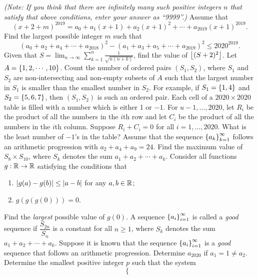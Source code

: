 \begin{enumerate}
    \textit{(Note: If you think that there are infinitely many such positive integers $n$ that satisfy that above conditions, enter your answer as ``9999''.)}
    \hyperrefitem[A::2020-O-1-9] Assume that \[(x+2+m)^{2019} = a_0 + a_1 (x+1) + a_2 (x+1)^2 + \cdots + a_{2019}(x+1)^{2019}.\] Find the largest possible integer $m$ such that \[(a_0 + a_2 + a_4 + \cdots + a_{2018})^2 - (a_1 + a_3 + a_5 + \cdots + a_{2019})^2 \leq 2020^{2019}.\]
    \hyperrefitem[A::2020-O-1-10] Given that $S = \displaystyle\lim_{n \to \infty} \sum_{k=1}^n \frac{1}{\sqrt{n(n+k)}}$, find the value of $\left\lfloor (S+2)^2 \right\rfloor$.
    \hyperrefitem[A::2020-O-1-11] Let $A = \left\lbrace 1, 2, \cdots, 10 \right\rbrace$. Count the number of ordered pairs $(S_1, S_2)$, where $S_1$ and $S_2$ are non-intersecting and non-empty subsets of $A$ such that the largest number in $S_1$ is smaller than the smallest number in $S_2$. For example, if $S_1 = \left\lbrace 1, 4 \right\rbrace$ and $S_2 = \left\lbrace 5, 6, 7 \right\rbrace$, then $(S_1, S_2)$ is such an ordered pair.
    \hyperrefitem[A::2020-O-1-12] Each cell of a $2020 \times 2020$ table is filled with a number which is either 1 or $-1$. For $u - 1, \ldots, 2020$, let $R_i$ be the product of all the numbers in the $i$th row and let $C_i$ be the product of all the numbers in the $i$th column. Suppose $R_i + C_i = 0$ for all $i = 1, \ldots, 2020$. What is the least number of $-1$'s in the table?
    \hyperrefitem[A::2020-O-1-13] Assume that the sequence $\left\lbrace a_k \right\rbrace_{k=1}^\infty$ follows an arithmetic progression with $a_2 + a_4 + a_9 = 24$. Find the maximum value of $S_8 \times S_{10}$, where $S_k$ denotes the sum $a_1 + a_2 + \cdots + a_k$.
    \hyperrefitem[A::2020-O-1-14] Consider all functions $g : \mathbb{R} \to \mathbb{R}$ satisfying the conditions that
    \begin{enumerate}
        \item $\left\lvert g(a) - g(b) \right\rvert \leq \left\lvert a - b \right\rvert$ for any $a, b \in \mathbb{R}$;
        \item $g(g(g(0))) = 0$.
    \end{enumerate}
    Find the \textit{largest} possible value of $g(0)$.
    \hyperrefitem[A::2020-O-1-15] A sequence $\left\lbrace a_i \right\rbrace_{i=1}^\infty$ is called a \textit{good} sequence if $\dfrac{S_{2n}}{S_n}$ is a constant for all $n \geq 1$, where $S_k$ denotes the sum $a_1 + a_2 + \cdots + a_k$. Suppose it is known that the sequence $\left\lbrace a_i \right\rbrace_{i = 1}^\infty$ is a \textit{good} sequence that follows an arithmetic progression. Determine $a_{2020}$ if $a_1 = 1 \neq a_2$.
    \hyperrefitem[A::2020-O-1-16] Determine the smallest positive integer $p$ such that the system \[\left\{
        \begin{aligned}

\end{aligned}\]
\end{enumerate}
